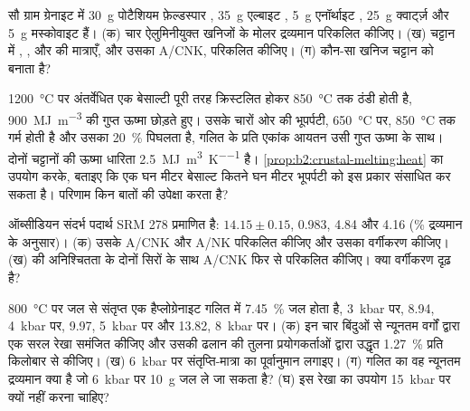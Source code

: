 \begin{exercise}[$\star\star$]\label{exo:b2:crustal-melting:6}
सौ ग्राम ग्रेनाइट में \qty{30}{\gram} पोटैशियम फ़ेल्डस्पार ,
\qty{35}{\gram} एल्बाइट , \qty{5}{\gram} एनॉर्थाइट ,
\qty{25}{\gram} क्वार्ट्ज़ और \qty{5}{\gram} मस्कोवाइट  हैं।
(क) चार ऐलुमिनीयुक्त खनिजों के मोलर द्रव्यमान परिकलित कीजिए। (ख) चट्टान में
, ,  और  की मात्राएँ, और उसका A/CNK, परिकलित कीजिए। (ग) कौन-सा
खनिज चट्टान को  बनाता है?
\end{exercise}

\begin{exercise}[$\star\star$]\label{exo:b2:crustal-melting:7}
\qty{1200}{\celsius} पर अंतर्वेधित एक बेसाल्टी  पूरी तरह क्रिस्टलित होकर
\qty{850}{\celsius} तक ठंडी होती है, \qty{900}{\mega\joule\per\cubic\metre} की गुप्त ऊष्मा छोड़ते हुए।
उसके चारों ओर की भूपर्पटी, \qty{650}{\celsius} पर, \qty{850}{\celsius} तक गर्म होती है और
उसका \qty{20}{\percent} पिघलता है, गलित के प्रति एकांक आयतन उसी गुप्त ऊष्मा के साथ। दोनों
चट्टानों की ऊष्मा धारिता \qty{2.5}{\mega\joule\per\cubic\metre\per\kelvin} है।
\cref{prop:b2:crustal-melting:heat} का उपयोग करके, बताइए कि एक घन मीटर बेसाल्ट कितने घन मीटर
भूपर्पटी को इस प्रकार संसाधित कर सकता है। परिणाम किन बातों की उपेक्षा करता है?
\end{exercise}

\begin{exercise}[$\star\star$]\label{exo:b2:crustal-melting:8}
ऑब्सीडियन संदर्भ पदार्थ SRM 278 प्रमाणित है: 
$14.15 \pm 0.15$,  0.983,  4.84 और  4.16 (\unit{\percent}
द्रव्यमान के अनुसार)। (क) उसके A/CNK और A/NK परिकलित कीजिए और उसका वर्गीकरण कीजिए। (ख)  की अनिश्चितता के दोनों
सिरों के साथ A/CNK फिर से परिकलित कीजिए। क्या वर्गीकरण दृढ़ है?
\end{exercise}

\begin{exercise}[$\star\star$]\label{exo:b2:crustal-melting:9}
\qty{800}{\celsius} पर जल से संतृप्त एक हैप्लोग्रेनाइट गलित में \qty{7.45}{\percent}
जल होता है, \qty{3}{kbar} पर, 8.94, \qty{4}{kbar} पर, 9.97, \qty{5}{kbar} पर और 13.82,
\qty{8}{kbar} पर। (क) इन चार बिंदुओं से न्यूनतम वर्गों द्वारा एक सरल रेखा समंजित कीजिए और
उसकी ढलान की तुलना प्रयोगकर्ताओं द्वारा उद्धृत \qty{1.27}{\percent} प्रति किलोबार से कीजिए।
(ख) \qty{6}{kbar} पर संतृप्ति-मात्रा का पूर्वानुमान लगाइए। (ग) गलित का वह न्यूनतम द्रव्यमान क्या है
जो \qty{6}{kbar} पर \qty{10}{\gram} जल ले जा सकता है? (घ) इस रेखा का उपयोग
\qty{15}{kbar} पर क्यों नहीं करना चाहिए?
\end{exercise}

